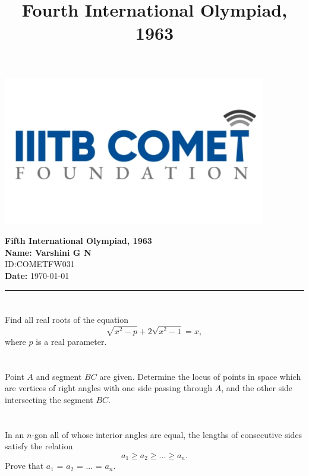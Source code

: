 \documentclass[12pt,a4paper]{article}
\begin{document}
\begin{center}
\begin{minipage}{0.2\textwidth}
  \includegraphics[width=\linewidth]{iiit_logo.png}
\end{minipage}
\hfill
\begin{minipage}{0.75\textwidth}
  \centering
  {\Large \textbf{Fifth International Olympiad, 1963}}\\[1ex]
  \textbf{Name: Varshini G N} \\[0.5ex]
  ID:COMETFW031\\
  \textbf{Date:} \today
\end{minipage}
\end{center}

\vspace{1em}
\title{Fourth International Olympiad, 1963}
\hrule
\vspace{1em}

\section{}
Find all real roots of the equation
\[
\sqrt{x^2 - p} + 2\sqrt{x^2 -1} = x,
\]
where $p$ is a real parameter.

\section{}
Point $A$ and segment $BC$ are given. Determine the locus of points in space which are vertices of right angles with one side passing through $A$, and the other side intersecting the segment $BC$.

\section{}
In an $n$-gon all of whose interior angles are equal, the lengths of consecutive sides satisfy the relation
\[
a_1 \geq a_2 \geq ... \geq a_n.
\]
Prove that $a_1$ = $a_2$ = ... = $a_n$.
\end{document}
